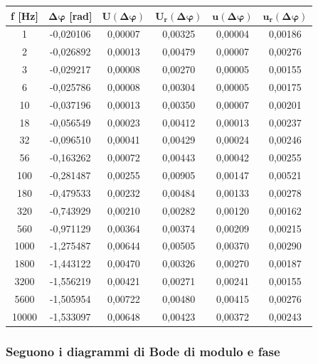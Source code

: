 \begin{table}[!ht]
    \centering
    \begin{tabular}{|c|c|c|c|c|c|}
    \hline

        \textbf{f [Hz]} & $\bm{\Delta\varphi}$ \textbf{[rad]} & $\bm{U(\Delta\varphi)}$ & $\bm{U_r(\Delta\varphi)}$ & $\bm{u(\Delta\varphi)}$ & $\bm{u_r(\Delta\varphi)}$ \\ \hline

        1 & -0,020106 & 0,00007 & 0,00325 & 0,00004 & 0,00186 \\ \hline
        2 & -0,026892 & 0,00013 & 0,00479 & 0,00007 & 0,00276 \\ \hline
        3 & -0,029217 & 0,00008 & 0,00270 & 0,00005 & 0,00155 \\ \hline
        6 & -0,025786 & 0,00008 & 0,00304 & 0,00005 & 0,00175 \\ \hline
        10 & -0,037196 & 0,00013 & 0,00350 & 0,00007 & 0,00201 \\ \hline
        18 & -0,056549 & 0,00023 & 0,00412 & 0,00013 & 0,00237 \\ \hline
        32 & -0,096510 & 0,00041 & 0,00429 & 0,00024 & 0,00246 \\ \hline
        56 & -0,163262 & 0,00072 & 0,00443 & 0,00042 & 0,00255 \\ \hline
        100 & -0,281487 & 0,00255 & 0,00905 & 0,00147 & 0,00521 \\ \hline
        180 & -0,479533 & 0,00232 & 0,00484 & 0,00133 & 0,00278 \\ \hline
        320 & -0,743929 & 0,00210 & 0,00282 & 0,00120 & 0,00162 \\ \hline
        560 & -0,971129 & 0,00364 & 0,00374 & 0,00209 & 0,00215 \\ \hline
        1000 & -1,275487 & 0,00644 & 0,00505 & 0,00370 & 0,00290 \\ \hline
        1800 & -1,443122 & 0,00470 & 0,00326 & 0,00270 & 0,00187 \\ \hline
        3200 & -1,556219 & 0,00421 & 0,00271 & 0,00241 & 0,00155 \\ \hline
        5600 & -1,505954 & 0,00722 & 0,00480 & 0,00415 & 0,00276 \\ \hline
        10000 & -1,533097 & 0,00648 & 0,00423 & 0,00372 & 0,00243 \\ \hline
    \end{tabular}
\end{table}

\subsubsection*{Seguono i diagrammi di Bode di modulo e fase }


